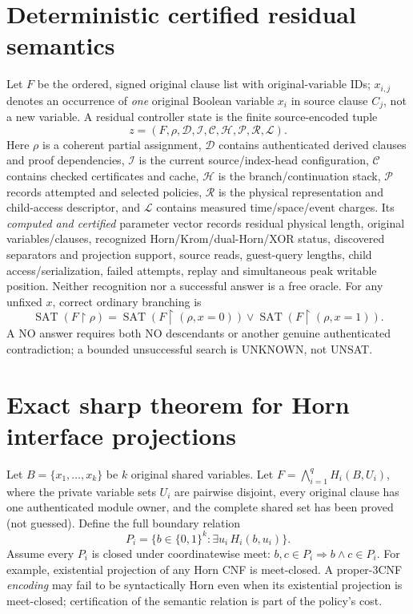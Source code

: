 \documentclass[11pt]{article}
\newcommand{\SAT}{\operatorname{SAT}}
\begin{document}
\section{Deterministic certified residual semantics}
Let $F$ be the ordered, signed original clause list with original-variable
IDs; $x_{i,j}$ denotes an occurrence of \emph{one} original Boolean
variable $x_i$ in source clause $C_j$, not a new variable. A residual
controller state is the finite source-encoded tuple
\[
 z=(F,\rho,\mathcal D,\mathcal I,\mathcal C,\mathcal H,
       \mathcal P,\mathcal R,\mathcal L).
\]
Here $\rho$ is a coherent partial assignment, $\mathcal D$ contains
authenticated derived clauses and proof dependencies, $\mathcal I$ is the
current source/index-head configuration, $\mathcal C$ contains checked
certificates and cache, $\mathcal H$ is the branch/continuation stack,
$\mathcal P$ records attempted and selected policies, $\mathcal R$ is the
physical representation and child-access descriptor, and $\mathcal L$
contains measured time/space/event charges. Its \emph{computed and
certified} parameter vector records residual physical length, original
variables/clauses, recognized Horn/Krom/dual-Horn/XOR status, discovered
separators and projection support, source reads, guest-query lengths,
child access/serialization, failed attempts, replay and simultaneous peak
writable position. Neither recognition nor a successful answer is a
free oracle. For any unfixed $x$, correct ordinary branching is
\[
 \SAT(F\!\upharpoonright\!\rho)=
 \SAT(F\!\upharpoonright\!(\rho,x=0))\lor
 \SAT(F\!\upharpoonright\!(\rho,x=1)).                         \tag{2}
\]
A NO answer requires both NO descendants or another genuine authenticated
contradiction; a bounded unsuccessful search is UNKNOWN, not UNSAT.

\section{Exact sharp theorem for Horn interface projections}
Let $B=\{x_1,\ldots,x_k\}$ be $k$ original shared variables.  Let
$F=\bigwedge_{i=1}^{q} H_i(B,U_i)$, where the private variable sets
$U_i$ are pairwise disjoint, every original clause has one authenticated
module owner, and the complete shared set has been proved (not guessed).
Define the full boundary relation
\[
 P_i=\{b\in\{0,1\}^k:\exists u_i\,H_i(b,u_i)\}.
\]
Assume every $P_i$ is closed under coordinatewise meet:
$b,c\in P_i\Rightarrow b\wedge c\in P_i$.
For example, existential projection of any Horn CNF is meet-closed.
A proper-3CNF \emph{encoding} may fail to be syntactically Horn even when
its existential projection is meet-closed; certification of the semantic
relation is part of the policy's cost.
\end{document}

